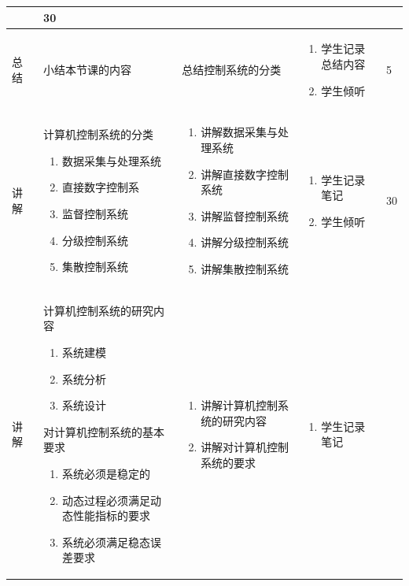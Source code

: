 {\begin{landscape}
\begin{longtable}{|m{10mm}|m{50mm}|m{50mm}|m{50mm}|m{15mm}|}
\begin{enumerate}
\end{enumerate} &30 \\\hline
总结&小结本节课的内容
&总结控制系统的分类 &\begin{enumerate}
\item 学生记录总结内容
\item 学生倾听
\end{enumerate} &5 \\\hline
讲解&计算机控制系统的分类
\begin{enumerate}
\item 数据采集与处理系统
\item 直接数字控制系
\item 监督控制系统
\item 分级控制系统
\item 集散控制系统
\end{enumerate} &\begin{enumerate}
\item 讲解数据采集与处理系统
\item 讲解直接数字控制系统
\item 讲解监督控制系统
\item 讲解分级控制系统
\item 讲解集散控制系统
\end{enumerate} &\begin{enumerate}
\item 学生记录笔记
\item 学生倾听
\end{enumerate} &30 \\\hline
讲解&计算机控制系统的研究内容
\begin{enumerate}
\item 系统建模
\item 系统分析
\item 系统设计
\end{enumerate}
对计算机控制系统的基本要求
\begin{enumerate}
\item 系统必须是稳定的
\item 动态过程必须满足动态性能指标的要求
\item 系统必须满足稳态误差要求
\end{enumerate} &\begin{enumerate}
\item 讲解计算机控制系统的研究内容
\item 讲解对计算机控制系统的要求
\end{enumerate} &\begin{enumerate}
\item 学生记录笔记

\end{enumerate}
\end{longtable}
\end{landscape}}
